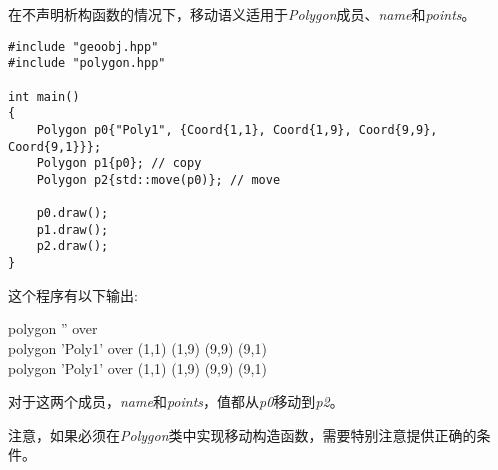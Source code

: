 在不声明析构函数的情况下，移动语义适用于\textit{Polygon}成员、\textit{name}和\textit{points}。\par

{\color{red}{poly/polygon.cpp}}

\begin{lstlisting}[caption={}]
#include "geoobj.hpp"
#include "polygon.hpp"

int main()
{
	Polygon p0{"Poly1", {Coord{1,1}, Coord{1,9}, Coord{9,9}, Coord{9,1}}};
	Polygon p1{p0}; // copy
	Polygon p2{std::move(p0)}; // move
	
	p0.draw();
	p1.draw();
	p2.draw();
}
\end{lstlisting}

这个程序有以下输出:\par

\begin{tcolorbox}[colback=white,colframe=black]
polygon '' over \\
polygon 'Poly1' over (1,1) (1,9) (9,9) (9,1) \\
polygon 'Poly1' over (1,1) (1,9) (9,9) (9,1) 
\end{tcolorbox}

对于这两个成员，\textit{name}和\textit{points}，值都从\textit{p0}移动到\textit{p2}。\par

注意，如果必须在\textit{Polygon}类中实现移动构造函数，需要特别注意提供正确的条件。\par



























































